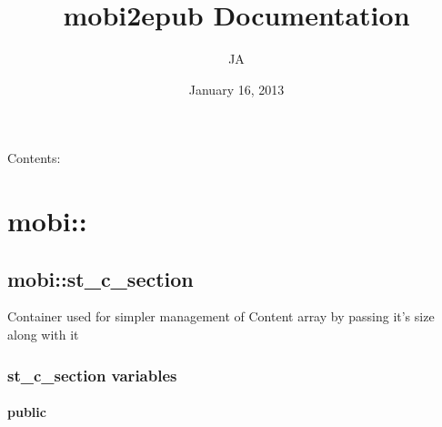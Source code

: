 \documentclass[letterpaper,10pt,english]{sphinxmanual}
\title{mobi2epub Documentation}
\date{January 16, 2013}
\author{JA}
\begin{document}
\maketitle
\tableofcontents
{}\label{index::doc}


Contents:


\chapter{mobi::}
\label{mobi:mobi}\label{mobi:welcome-to-mobi2epub-s-documentation}\label{mobi::doc}

\section{mobi::st\_c\_section}
\label{st_c_section:mobi-st-c-section}\label{st_c_section::doc}

\begin{fulllineitems}
\label{st_c_section:mobi::st_c_section}
Container used for simpler management of Content array by passing it's
size along with it

\end{fulllineitems}



\subsection{st\_c\_section variables}
\label{st_c_section:st-c-section-variables}

\subsubsection{public}
\label{st_c_section:public}\begin{quote}

\begin{fulllineitems}
\label{st_c_section:st_c_section::content__uint8P}
\end{fulllineitems}


\begin{fulllineitems}
\label{st_c_section:st_c_section::size__unsigned-i}
\end{fulllineitems}

\end{quote}
\end{document}
